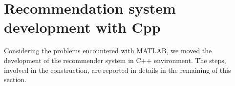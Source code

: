 \section{Recommendation system development with Cpp}

Considering the problems encountered with MATLAB, we moved the development of the recommender system in C++ environment. The steps, involved in the construction, are reported in details in the remaining of this section.



